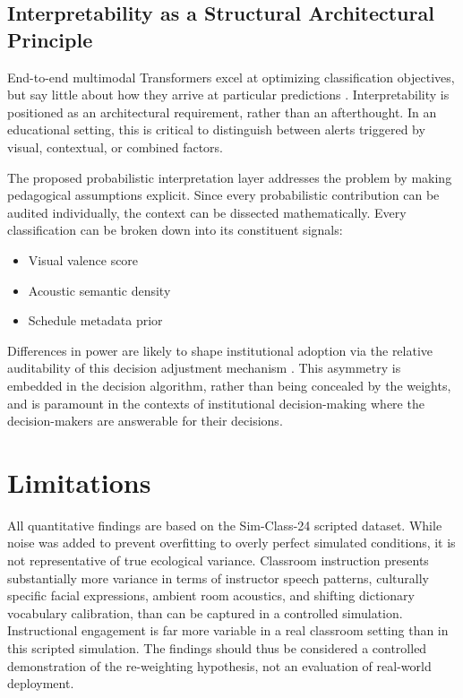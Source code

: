 \documentclass[conference]{IEEEtran}
\begin{document}
\subsection{Interpretability as a Structural Architectural Principle}
End-to-end multimodal Transformers excel at optimizing classification objectives, but say little about how they arrive at particular predictions \cite{b6}. Interpretability is positioned as an architectural requirement, rather than an afterthought. In an educational setting, this is critical to distinguish between alerts triggered by visual, contextual, or combined factors.

The proposed probabilistic interpretation layer addresses the problem by making pedagogical assumptions explicit. Since every probabilistic contribution can be audited individually, the context can be dissected mathematically. Every classification can be broken down into its constituent signals:
\begin{itemize}
    \item Visual valence score
    \item Acoustic semantic density
    \item Schedule metadata prior
\end{itemize}

Differences in power are likely to shape institutional adoption via the relative auditability of this decision adjustment mechanism \cite{b21}. This asymmetry is embedded in the decision algorithm, rather than being concealed by the weights, and is paramount in the contexts of institutional decision-making where the decision-makers are answerable for their decisions.

\section{Limitations}
All quantitative findings are based on the Sim-Class-24 scripted dataset. While noise was added to prevent overfitting to overly perfect simulated conditions, it is not representative of true ecological variance. Classroom instruction presents substantially more variance in terms of instructor speech patterns, culturally specific facial expressions, ambient room acoustics, and shifting dictionary vocabulary calibration, than can be captured in a controlled simulation. Instructional engagement is far more variable in a real classroom setting than in this scripted simulation. The findings should thus be considered a controlled demonstration of the re-weighting hypothesis, not an evaluation of real-world deployment.
\end{document}
